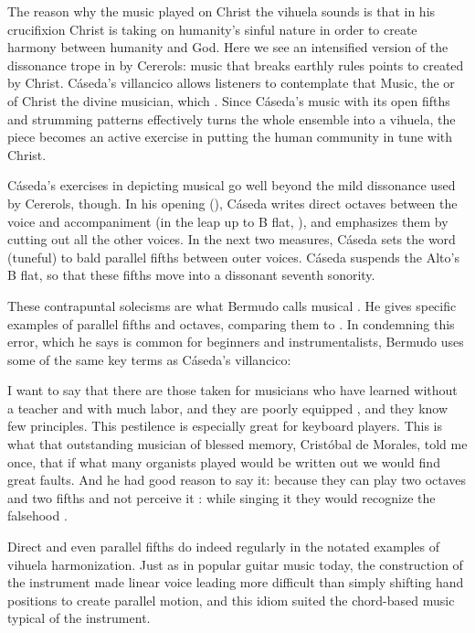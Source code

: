 
The reason why the music played on Christ the vihuela sounds  is
that in his crucifixion Christ is taking on humanity's sinful nature in order
to create harmony between humanity and God.
Here we see an intensified version of the dissonance trope in
 by Cererols: music that breaks earthly rules points
to  created by Christ.
Cáseda's villancico allows listeners to contemplate that Music, the
 or  of Christ the divine
musician, which .
Since Cáseda's music with its open fifths and strumming patterns effectively
turns the whole ensemble into a vihuela, the piece becomes an active exercise
in putting the human community in tune with Christ.

Cáseda's exercises in depicting musical  go well beyond the
mild dissonance used by Cererols, though.
In his opening (), Cáseda writes
direct octaves between the voice and accompaniment (in the leap up to B flat,
), and emphasizes them by cutting out all the other voices.
In the next two measures, Cáseda sets the word  (tuneful) to
bald parallel fifths between outer voices.
Cáseda suspends the Alto's B flat, so that these fifths move into a dissonant
seventh sonority.


These contrapuntal solecisms are what Bermudo calls musical .
He gives specific examples of parallel fifths and octaves, comparing them to
.%
    \Autocite[\folio{128\verso}]{Bermudo:Declaracion} 
In condemning this error, which he says is common for beginners and
instrumentalists, Bermudo uses some of the same key terms as Cáseda's
villancico:
\begin{quoting}
    I want to say that there are those taken for musicians who have learned
    without a teacher and with much labor, and they are poorly equipped
    , and they know few principles.
    This pestilence is especially great for keyboard players.  
    This is what that outstanding musician of blessed memory, Cristóbal de
    Morales, told me once, that if what many organists played would be written
    out we would find great faults.  
    And he had good reason to say it: because they can play two octaves and two
    fifths and not perceive it : while
    singing it they would recognize the falsehood .%
        \Autocite[\folio{128\verso}]{Bermudo:Declaracion} 
\end{quoting}
Direct and even parallel fifths do indeed regularly in the notated examples of
vihuela harmonization.%
    \Autocite{Araujo-Mendonca:Vihuela}
Just as in popular guitar music today, the construction of the instrument made
linear voice leading more difficult than simply shifting hand positions to
create parallel motion, and this idiom suited the chord-based music typical of
the instrument.

